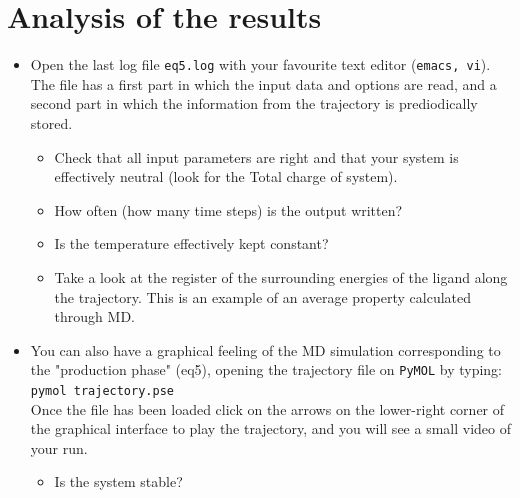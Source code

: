 \documentclass[a4paper,12pt]{article}
\newcommand{\sctn}[1]{\section{\large #1}}
\newcommand{\pymol}{\texttt{PyMOL}}
\begin{document}
\sctn {Analysis of the results}
\begin{itemize}
\item Open the last log file {\texttt {eq5.log}} with your favourite text editor (\texttt{emacs, vi}). The file has a first part in which the input data and options are read, and a second part in which the information from the trajectory is prediodically stored.
    \begin{itemize}
    \item Check that all input parameters are right and that your system is effectively neutral (look for the Total charge of system).
    \item How often (how many time steps) is the output written?
    \item Is the temperature effectively kept constant?
    \item Take a look at the register of the surrounding energies of the ligand along the trajectory. This is an example of an average property calculated through MD.
    \end {itemize}
\item You can also have a graphical feeling of the MD simulation corresponding to the "production phase" (eq5), opening the trajectory file on {\pymol} by typing:\\
\texttt{pymol trajectory.pse} \\
Once the file has been loaded click on the arrows on the
lower-right corner of the graphical interface to play the
trajectory, and you will see a small video of your run.
\begin {itemize}
\item Is the system stable?
\end {itemize}
\end {itemize}
\end{document}
